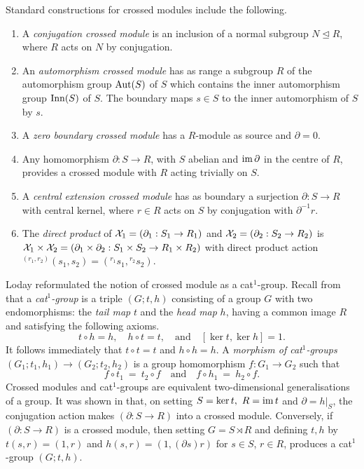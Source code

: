 \documentclass[a4paper,11pt]{article}
\theoremstyle{plain}
\theoremstyle{definition}
\begin{document}
Standard constructions for crossed modules include the following. 
\begin{enumerate}
\item 
A \emph{conjugation crossed module}  
is an inclusion of a normal subgroup $N \unlhd R$, 
where $R$ acts on $N$ by conjugation.
\item 
An \emph{automorphism crossed module}  
has as range a subgroup $R$ of the automorphism group $\mathrm{Aut}(S)$ of $S$ 
which contains the inner automorphism group $\mathrm{Inn}(S)$ of $S$. 
The boundary maps $s \in S$ to the inner automorphism of $S$ by $s$.
\item 
A \emph{zero boundary crossed module}  
has a $R$-module as source and $\partial = 0$.
\item 
Any homomorphism $\partial : S \to R$, with $S$ abelian 
and $\mathrm{im}\,\partial$ in the centre of $R$, 
provides a crossed module with $R$ acting trivially on $S$.
\item 
A \emph{central extension crossed module} 
has as boundary a surjection $\partial : S \to R$ with central kernel, 
where $r \in R$ acts on $S$ by conjugation with $\partial^{-1}r$.
\item 
The \emph{direct product} of  
$\mathcal{X}_1 = (\partial_1 : S_1 \to R_1)$ and $\mathcal{X}_2 = (\partial_2 : S_2 \to R_2)$ 
is $\mathcal{X}_1 \times \mathcal{X}_2 
= (\partial_1 \times \partial_2 : S_1 \times S_2 \to R_1 \times R_2)$ 
with direct product action 
${}^{(r_1,r_2)}(s_1,s_2) = \left({}^{r_1}s_1,{}^{r_2}s_2\right)$. 
\end{enumerate}

Loday reformulated the notion of crossed module as a cat$^{1}$-group. 
Recall from \cite{Loday} that a \emph{cat$^{1}$-group} is a triple $(G;t,h)$ consisting of a group $G$ with two endomorphisms: 
the \emph{tail map} $t$ and the \emph{head map} $h$, 
having a common image $R$ and satisfying the following axioms. 
\begin{equation} \label{cat1-axioms} 
t \circ h = h, \quad  
h \circ t = t, 
\quad \mbox{and}\quad  [\ker t,\ker h] = 1. 
\end{equation} 
It follows immediately that $t \circ t = t$ and $h \circ h = h$. 
A \emph{morphism of cat}$^{1}$\emph{-groups} 
$(G_{1};t_1,h_1) \rightarrow (G_{2};t_2,h_2)$ 
is a group homomorphism $f : G_{1} \rightarrow G_{2}$ such that 
\[ 
f \circ t_1 ~=~ t_2 \circ f  
\quad\mbox{and}\quad 
f \circ h_1 ~=~ h_2 \circ f.
\] 
Crossed modules and cat$^{1}$-groups are equivalent two-dimensional 
generalisations of a group. 
It was shown in \cite[Lemma 2.2]{Loday} that, 
on setting $S = \ker t,~ R = \mathrm{im}\, t$ and $\partial = h|_{S}$, 
the conjugation action makes $(\partial : S \rightarrow R)$ 
into a crossed module. 
Conversely, if $(\partial : S \rightarrow R)$ is a crossed module, 
then setting $G = S \rtimes R$ and defining $t,h$ by $t(s,r) = (1,r)$ 
and $h(s,r) = (1,(\partial s)r)$ for $s \in S$, $r \in R$, 
produces a cat$^{1}$-group $(G;t,h)$.
\end{document}
